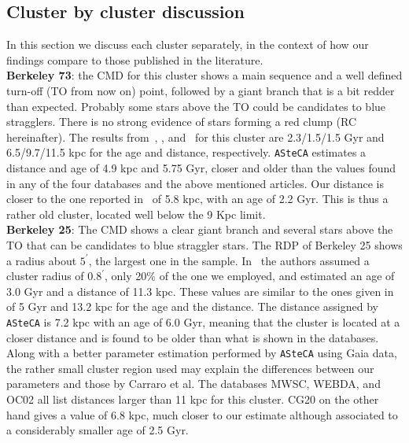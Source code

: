 \documentclass[referee]{aa}
\begin{document}
 \subsection{Cluster by cluster discussion}
  \label{ssec:indiv_clusters}

  In this section we discuss each cluster separately, in the context of how our
  findings compare to those published in the literature.\\

  \noindent \textbf{Berkeley 73}: the CMD for this cluster shows a main sequence
  and a well defined turn-off (TO from now on) point, followed by a giant branch
  that is a bit redder than expected. Probably some stars above the TO could be
  candidates to blue stragglers. There is no strong evidence of stars forming a
  red clump (RC hereinafter).
  The results from~\cite{Ortolani_2005}, \cite{Carraro_2005},
  and~\cite{Carraro_2007_oldOC} for this cluster are 2.3/1.5/1.5 Gyr and
  6.5/9.7/11.5 kpc for the age and distance, respectively.
  \texttt{ASteCA} estimates a distance and age of 4.9 kpc and 5.75 Gyr,
  closer and older than the values found in any of the four databases and the
  above mentioned articles. Our distance is closer to the one reported
  in~\cite{Dias_2021} of 5.8 kpc, with an age of 2.2 Gyr. This is thus a
  rather old cluster, located well below the 9 Kpc limit.\\

  \noindent \textbf{Berkeley 25}: The CMD shows a clear giant branch and several stars
  above the TO that can be candidates to blue straggler stars. The RDP of
  Berkeley 25 shows a radius about $5^{\prime}$, the largest one in the sample.
  In~\cite{Carraro_2005} the authors assumed a cluster radius of $0.8^{\prime}$,
  only 20\% of the one we employed, and estimated an age of 3.0 Gyr and a
  distance of 11.3 kpc. These values are similar to the ones given
  in~\cite{Carraro_2007_oldOC} of 5 Gyr and 13.2 kpc for the age and the
  distance.
  The distance assigned by \texttt{ASteCA} is 7.2 kpc with an age of 6.0 Gyr,
  meaning that the cluster is located at a closer distance and is found to be
  older than what is shown in the databases.
  Along with a better parameter estimation performed by \texttt{ASteCA} using
  Gaia data, the rather small cluster region used may explain the differences
  between our parameters and those by Carraro et al. The databases MWSC,
  WEBDA, and OC02 all list distances larger than 11 kpc for this cluster. CG20
  on the other hand gives a value of 6.8 kpc, much closer to our estimate
  although associated to a considerably smaller age of 2.5 Gyr.\\
\end{document}
